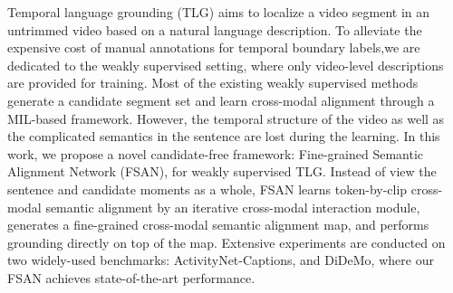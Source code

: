 Temporal language grounding (TLG) aims to localize a video segment in an untrimmed video based on a natural language description. To alleviate the expensive cost of manual annotations for temporal boundary labels,we are dedicated to the weakly supervised setting, where only video-level descriptions are provided for training. Most of the existing weakly supervised methods generate a candidate segment set and learn cross-modal alignment through a MIL-based framework. However, the temporal structure of the video as well as the complicated semantics in the sentence are lost during the learning. In this work, we propose a novel candidate-free framework: Fine-grained Semantic Alignment Network (FSAN), for weakly supervised TLG. Instead of view the sentence and candidate moments as a whole, FSAN learns token-by-clip cross-modal semantic alignment by an iterative cross-modal interaction module, generates a fine-grained cross-modal semantic alignment map, and performs grounding directly on top of the map. Extensive experiments are conducted on two widely-used benchmarks: ActivityNet-Captions, and DiDeMo, where our FSAN achieves state-of-the-art performance.
